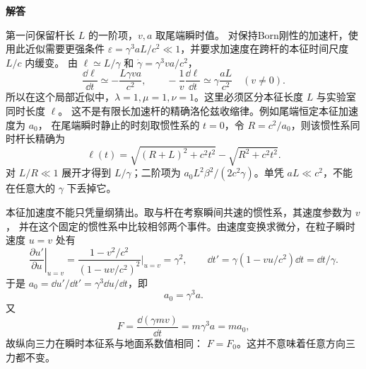\begin{advsolution}
\begin{center}\begin{minipage}{.96\linewidth}\centering
\raggedright{\bfseries\color{DeepBlue}解答}\par\smallskip\centering

\label{advA6:quality:A6-relativity:a1}
\end{minipage}\end{center}

第一问保留杆长 $L$ 的一阶项，$v,a$ 取尾端瞬时值。
对保持Born刚性的加速杆，使用此近似需要更强条件
$\varepsilon=\gamma^3aL/c^2\ll1$，并要求加速度在跨杆的本征时间尺度 $L/c$ 内缓变。
由 $\ell\simeq L/\gamma$ 和
$\dot\gamma=\gamma^3va/c^2$，
\[
 \boxed{\frac{\dd\ell}{\dd t}
 \simeq-\frac{L\gamma va}{c^2}},\qquad
 -\frac1v\frac{\dd\ell}{\dd t}
 \simeq\gamma\frac{aL}{c^2}\quad(v\ne0).
\]
所以在这个局部近似中，$\lambda=1,\mu=1,\nu=1$。这里必须区分本征长度 $L$ 与实验室同时长度 $\ell$。
这不是有限长加速杆的精确洛伦兹收缩律。例如尾端恒定本征加速度为 $a_0$，
在尾端瞬时静止的时刻取惯性系的 $t=0$，令 $R=c^2/a_0$，则该惯性系同时杆长精确为
\[
 \ell(t)=\sqrt{(R+L)^2+c^2t^2}-\sqrt{R^2+c^2t^2}.
\]
对 $L/R\ll1$ 展开才得到 $L/\gamma$；二阶项为
$a_0L^2\beta^2/(2c^2\gamma)$。单凭 $aL\ll c^2$，不能在任意大的 $\gamma$ 下丢掉它。

本征加速度不能只凭量纲猜出。取与杆在考察瞬间共速的惯性系，其速度参数为 $v$，
并在这个固定的惯性系中比较相邻两个事件。由速度变换求微分，在粒子瞬时速度 $u=v$ 处有
\[
 \left.\frac{\partial u'}{\partial u}\right|_{u=v}
 =\frac{1-v^2/c^2}{(1-uv/c^2)^2}\bigg|_{u=v}=\gamma^2,
 \qquad \dd t'=\gamma(1-vu/c^2)\dd t=\dd t/\gamma.
\]
于是 $a_0=\dd u'/\dd t'=\gamma^3\dd u/\dd t$，即
\[
 \boxed{a_0=\gamma^3a}.
\]
又
\[
 F=\frac{\dd(\gamma mv)}{\dd t}
 =m\gamma^3a=ma_0,
\]
故纵向三力在瞬时本征系与地面系数值相同：
$\boxed{F=F_0}$。这并不意味着任意方向三力都不变。


\end{advsolution}
